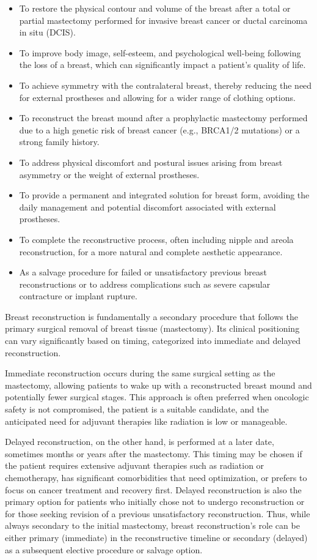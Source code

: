 \begin{itemize}
  \item To restore the physical contour and volume of the breast after a total or partial mastectomy performed for invasive breast cancer or ductal carcinoma in situ (DCIS).
  \item To improve body image, self-esteem, and psychological well-being following the loss of a breast, which can significantly impact a patient's quality of life.
  \item To achieve symmetry with the contralateral breast, thereby reducing the need for external prostheses and allowing for a wider range of clothing options.
  \item To reconstruct the breast mound after a prophylactic mastectomy performed due to a high genetic risk of breast cancer (e.g., BRCA1/2 mutations) or a strong family history.
  \item To address physical discomfort and postural issues arising from breast asymmetry or the weight of external prostheses.
  \item To provide a permanent and integrated solution for breast form, avoiding the daily management and potential discomfort associated with external prostheses.
  \item To complete the reconstructive process, often including nipple and areola reconstruction, for a more natural and complete aesthetic appearance.
  \item As a salvage procedure for failed or unsatisfactory previous breast reconstructions or to address complications such as severe capsular contracture or implant rupture.
\end{itemize}

Breast reconstruction is fundamentally a secondary procedure that follows the primary surgical removal of breast tissue (mastectomy). Its clinical positioning can vary significantly based on timing, categorized into immediate and delayed reconstruction. 

Immediate reconstruction occurs during the same surgical setting as the mastectomy, allowing patients to wake up with a reconstructed breast mound and potentially fewer surgical stages. This approach is often preferred when oncologic safety is not compromised, the patient is a suitable candidate, and the anticipated need for adjuvant therapies like radiation is low or manageable.

Delayed reconstruction, on the other hand, is performed at a later date, sometimes months or years after the mastectomy. This timing may be chosen if the patient requires extensive adjuvant therapies such as radiation or chemotherapy, has significant comorbidities that need optimization, or prefers to focus on cancer treatment and recovery first. Delayed reconstruction is also the primary option for patients who initially chose not to undergo reconstruction or for those seeking revision of a previous unsatisfactory reconstruction. Thus, while always secondary to the initial mastectomy, breast reconstruction's role can be either primary (immediate) in the reconstructive timeline or secondary (delayed) as a subsequent elective procedure or salvage option.

